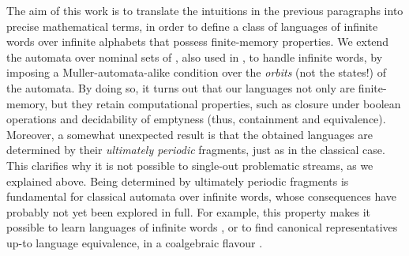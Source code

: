 The aim of this work is to translate the intuitions in the previous paragraphs into precise mathematical terms, in order to define a class of languages of infinite words over infinite alphabets that possess finite-memory properties. We extend the automata over nominal sets of \cite{MikLICS}, also used in \cite{CianciaTuostoTR}, to handle infinite words, by imposing a Muller-automata-alike condition over the \emph{orbits} (not the states!) of the automata. By doing so, it turns out that our languages not only are finite-memory, but they retain computational properties, such as closure under boolean operations and decidability of emptyness (thus, containment and equivalence). Moreover, a somewhat unexpected result is that the obtained languages are determined by their \emph{ultimately periodic} fragments, just as in the classical case. This clarifies why it is not possible to single-out problematic streams, as we explained above. Being determined by ultimately periodic fragments is fundamental for classical automata over infinite words, whose consequences have probably not yet been explored in full. For example, this property makes it possible to learn languages of infinite words \cite{Emerson}, or to find canonical representatives up-to language equivalence, in a coalgebraic flavour \cite{CV12}. 



